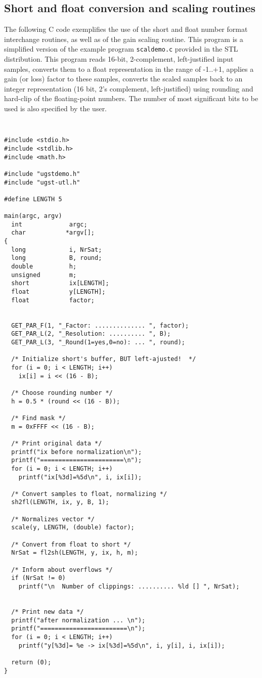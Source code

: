 \subsection{Short and float conversion and scaling routines}

The following C code exemplifies the use of the short and float
number  format interchange routines, as well as of the gain scaling
routine. This  program is a simplified version of the example program
{\tt scaldemo.c} provided in the STL distribution. This program reads
16-bit, 2-complement, left-justified input samples, converts them to
a float representation in the range of -1..+1, applies a gain (or
loss) factor to these samples, converts the scaled samples back to an
integer representation (16 bit, 2's complement, left-justified) using
rounding and hard-clip of the floating-point numbers. The number of
most significant bits to be used is also specified by the user.

{\tt\small
\begin{verbatim}
#include <stdio.h>
#include <stdlib.h>
#include <math.h>

#include "ugstdemo.h"
#include "ugst-utl.h"

#define LENGTH 5

main(argc, argv)
  int             argc;
  char           *argv[];
{
  long            i, NrSat;
  long            B, round;
  double          h;
  unsigned        m;
  short           ix[LENGTH];
  float           y[LENGTH];
  float           factor;


  GET_PAR_F(1, "_Factor: .............. ", factor);
  GET_PAR_L(2, "_Resolution: .......... ", B);
  GET_PAR_L(3, "_Round(1=yes,0=no): ... ", round);

  /* Initialize short's buffer, BUT left-ajusted!  */
  for (i = 0; i < LENGTH; i++)
    ix[i] = i << (16 - B);

  /* Choose rounding number */
  h = 0.5 * (round << (16 - B));

  /* Find mask */
  m = 0xFFFF << (16 - B);

  /* Print original data */
  printf("ix before normalization\n");
  printf("=======================\n");
  for (i = 0; i < LENGTH; i++)
    printf("ix[%3d]=%5d\n", i, ix[i]);

  /* Convert samples to float, normalizing */
  sh2fl(LENGTH, ix, y, B, 1);

  /* Normalizes vector */
  scale(y, LENGTH, (double) factor);

  /* Convert from float to short */
  NrSat = fl2sh(LENGTH, y, ix, h, m);

  /* Inform about overflows */
  if (NrSat != 0)
    printf("\n  Number of clippings: .......... %ld [] ", NrSat);


  /* Print new data */
  printf("after normalization ... \n");
  printf("========================\n");
  for (i = 0; i < LENGTH; i++)
    printf("y[%3d]= %e -> ix[%3d]=%5d\n", i, y[i], i, ix[i]);

  return (0);
}
\end{verbatim}
}

